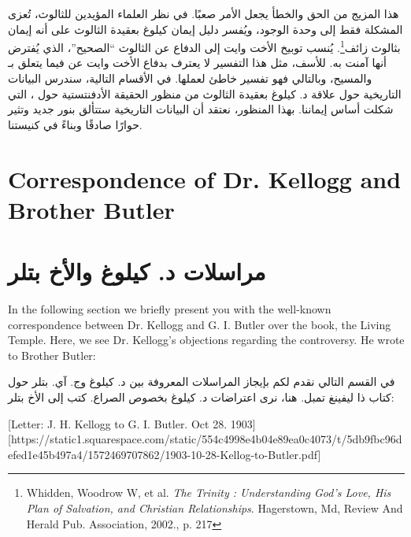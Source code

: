 هذا المزيج من الحق والخطأ يجعل الأمر صعبًا. في نظر العلماء المؤيدين للثالوث، تُعزى المشكلة فقط إلى وحدة الوجود، ويُفسر دليل إيمان كيلوغ بعقيدة الثالوث على أنه إيمان بثالوث زائف\footnote{Whidden, Woodrow W, et al. \textit{The Trinity : Understanding God's Love, His Plan of Salvation, and Christian Relationships}. Hagerstown, Md, Review And Herald Pub. Association, 2002., p. 217}. يُنسب توبيخ الأخت وايت إلى الدفاع عن الثالوث “الصحيح”، الذي يُفترض أنها آمنت به. للأسف، مثل هذا التفسير لا يعترف بدفاع الأخت وايت عن  فيما يتعلق بـ  والمسيح، وبالتالي فهو تفسير خاطئ لعملها. في الأقسام التالية، سندرس البيانات التاريخية حول علاقة د. كيلوغ بعقيدة الثالوث من منظور الحقيقة الأدفنتستية حول ، التي شكلت أساس إيماننا. بهذا المنظور، نعتقد أن البيانات التاريخية ستتألق بنور جديد وتثير حوارًا صادقًا وبناءً في كنيستنا.


\section*{Correspondence of Dr. Kellogg and Brother Butler}


\section*{مراسلات د. كيلوغ والأخ بتلر}


In the following section we briefly present you with the well-known correspondence between Dr. Kellogg and G. I. Butler over the book, the Living Temple. Here, we see Dr. Kellogg’s objections regarding the controversy. He wrote to Brother Butler:


في القسم التالي نقدم لكم بإيجاز المراسلات المعروفة بين د. كيلوغ وج. آي. بتلر حول كتاب ذا ليفينغ تمبل. هنا، نرى اعتراضات د. كيلوغ بخصوص الصراع. كتب إلى الأخ بتلر:


[Letter: J. H. Kellogg to G. I. Butler. Oct 28. 1903][https://static1.squarespace.com/static/554c4998e4b04e89ea0c4073/t/5db9fbc96defed1e45b497a4/1572469707862/1903-10-28-Kellog-to-Butler.pdf]


